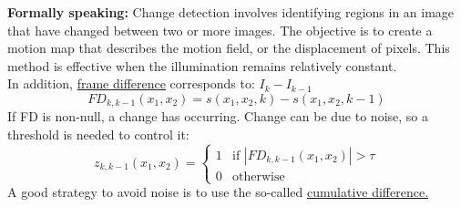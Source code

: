 \textbf{Formally speaking:}
Change detection involves identifying regions in an image that have changed between two or more images. 
The objective is to create a motion map that describes the motion field, or the displacement of pixels. 
This method is effective when the illumination remains relatively constant.
\\In addition, \underline{frame difference} corresponds to: $I_k - I_{k-1}$
\[
    FD_{k, k-1}(x_1, x_2)= s(x_1, x_2, k)-s(x_1, x_2, k-1)
\]
If FD is non-null, a change has occurring. Change can be due to noise, so a threshold is needed to control it:
\[
    z_{k, k-1}(x_1, x_2)= \begin{cases} 1 & \text{if } |FD_{k, k-1}(x_1, x_2)| > \tau \\ 0 & \text{otherwise} \end{cases}
\]
A good strategy to avoid noise is to use the so-called \underline{cumulative difference.}
